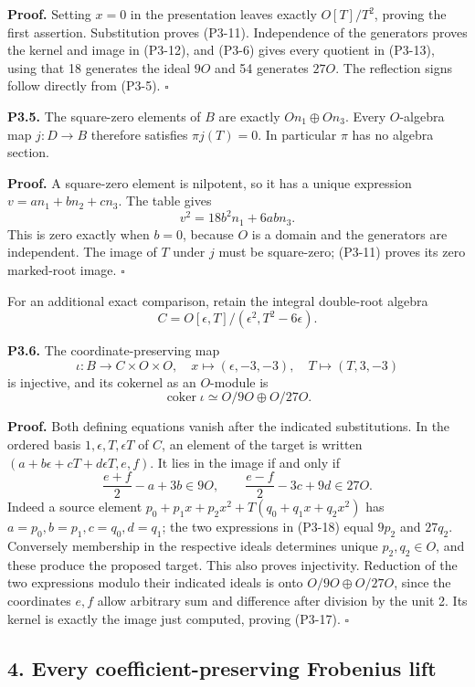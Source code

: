 \documentclass[
  10pt,
]{article}
\begin{document}
\textbf{Proof.} Setting \(x=0\) in the presentation leaves exactly
\(O[T]/T^2\), proving the first assertion. Substitution proves (P3-11).
Independence of the generators proves the kernel and image in (P3-12),
and (P3-6) gives every quotient in (P3-13), using that 18 generates the
ideal \(9O\) and 54 generates \(27O\). The reflection signs follow
directly from (P3-5). \(\square\)

\textbf{P3.5.} The square-zero elements of \(B\) are exactly
\(On_1\oplus On_3\). Every \(O\)-algebra map \(j:D\to B\) therefore
satisfies \(\pi j(T)=0\). In particular \(\pi\) has no algebra section.

\textbf{Proof.} A square-zero element is nilpotent, so it has a unique
expression \(v=an_1+bn_2+cn_3\). The table gives \[
v^2=18b^2n_1+6abn_3.
\tag{P3-14}
\] This is zero exactly when \(b=0\), because \(O\) is a domain and the
generators are independent. The image of \(T\) under \(j\) must be
square-zero; (P3-11) proves its zero marked-root image. \(\square\)

For an additional exact comparison, retain the integral double-root
algebra \[
C=O[\epsilon,T]/(\epsilon^2,T^2-6\epsilon).
\tag{P3-15}
\]

\textbf{P3.6.} The coordinate-preserving map \[
\iota:B\longrightarrow C\times O\times O,
\quad x\longmapsto(\epsilon,-3,-3),\quad
T\longmapsto(T,3,-3)
\tag{P3-16}
\] is injective, and its cokernel as an \(O\)-module is \[
\operatorname{coker}\iota\simeq O/9O\oplus O/27O.
\tag{P3-17}
\]

\textbf{Proof.} Both defining equations vanish after the indicated
substitutions. In the ordered basis \(1,\epsilon,T,\epsilon T\) of
\(C\), an element of the target is written
\((a+b\epsilon+cT+d\epsilon T,e,f)\). It lies in the image if and only
if \[
\frac{e+f}{2}-a+3b\in9O,\qquad
\frac{e-f}{2}-3c+9d\in27O.
\tag{P3-18}
\] Indeed a source element \(p_0+p_1x+p_2x^2+T(q_0+q_1x+q_2x^2)\) has
\(a=p_0,b=p_1,c=q_0,d=q_1\); the two expressions in (P3-18) equal
\(9p_2\) and \(27q_2\). Conversely membership in the respective ideals
determines unique \(p_2,q_2\in O\), and these produce the proposed
target. This also proves injectivity. Reduction of the two expressions
modulo their indicated ideals is onto \(O/9O\oplus O/27O\), since the
coordinates \(e,f\) allow arbitrary sum and difference after division by
the unit 2. Its kernel is exactly the image just computed, proving
(P3-17). \(\square\)

\subsection{4. Every coefficient-preserving Frobenius
lift}\label{every-coefficient-preserving-frobenius-lift}
\end{document}
